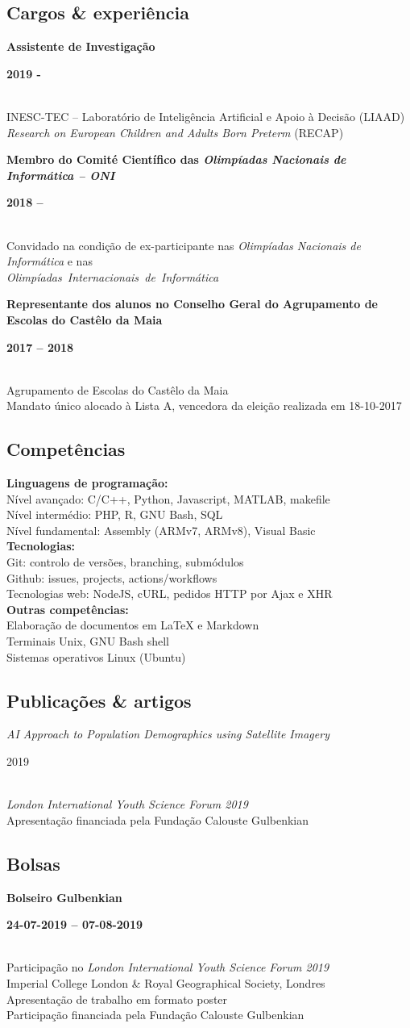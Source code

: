 \documentclass[8pt]{extarticle}
\newcommand{\parag}[1]{
\begin{minipage}{\textwidth} \hfill
\begin{minipage}{\dimexpr\textwidth-0.6cm}
	#1
\end{minipage}
\end{minipage}
}
\newcommand{\itemtime}[2]{
#1 \hfill \begin{minipage}[t]{0.185\textwidth}         #2  \end{minipage}
}
\newcommand{\job}[3]{\parag{
\itemtime{\textbf{#1}}{\textbf{#2}}\\
#3 \vspace*{9px}}}
\newcommand{\pub}[3]{\parag{
\itemtime{\textit{#1}}{#2}\\
#3 \vspace*{9px}}}
\begin{document}
\subsection*{Cargos \& experiência}
\job{Assistente de Investigação}{2019 -}{
INESC-TEC – Laboratório de Inteligência Artificial e Apoio à Decisão (LIAAD)\\
\textit{Research on European Children and Adults Born Preterm} (RECAP)
}
\job{Membro do Comité Científico das \textit{Olimpíadas Nacionais de Informática – ONI}}{2018 – }{
Convidado na condição de ex-participante nas \textit{Olimpíadas Nacionais de Informática} e nas \\
\mbox{\textit{Olimpíadas Internacionais de Informática}}
}
\job{Representante dos alunos no Conselho Geral do Agrupamento de Escolas do Castêlo da Maia}{2017 – 2018}{
Agrupamento de Escolas do Castêlo da Maia\\
Mandato único alocado à Lista A, vencedora da eleição realizada em 18-10-2017
}
\subsection*{Competências}
\parag{
\textbf{Linguagens de programação:}\\
Nível avançado: C/C++, Python, Javascript, MATLAB, makefile\\
Nível intermédio: PHP, R, GNU Bash, SQL\\
Nível fundamental: Assembly (ARMv7, ARMv8), Visual Basic\\ 
\textbf{Tecnologias:}\\
Git: controlo de versões, branching, submódulos\\
Github: issues, projects, actions/workflows\\
Tecnologias web: NodeJS, cURL, pedidos HTTP por Ajax e XHR\\
\textbf{Outras competências:}\\
Elaboração de documentos em LaTeX e Markdown\\
Terminais Unix, GNU Bash shell\\
Sistemas operativos Linux (Ubuntu)
}
\subsection*{Publicações \& artigos}
\pub{AI Approach to Population Demographics using Satellite Imagery}{2019}{
\textit{London International Youth Science Forum 2019}\\
Apresentação financiada pela Fundação Calouste Gulbenkian
}
\subsection*{Bolsas}
\job{Bolseiro Gulbenkian}{24-07-2019 – 07-08-2019}{
Participação no \textit{London International Youth Science Forum 2019}\\
Imperial College London \& Royal Geographical Society, Londres\\
Apresentação de trabalho em formato poster\\
Participação financiada pela Fundação Calouste Gulbenkian
}
\end{document}
